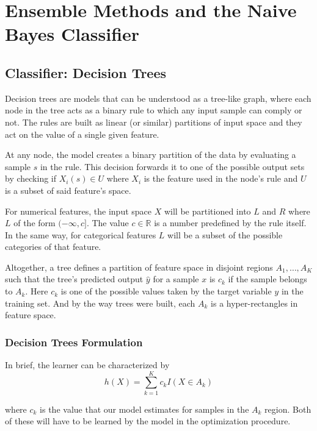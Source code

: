 \chapter{Ensemble Methods and the Naive Bayes Classifier}\label{ch:ensembleMethods}


\section{Classifier: Decision Trees}\label{section:decision_trees}


Decision trees are models that can be understood as a tree-like graph, where each node in the tree acts as a binary rule to which any input sample can comply or not. The rules are built as linear (or similar) partitions of input space and they act on the value of a single given feature.

At any node, the model creates a binary partition of the data by evaluating a sample $s$ in the rule. This decision forwards it to one of the possible output sets by checking if $X_i(s) \in U$ where $X_i$ is the feature used in the node's rule and $U$ is a subset of said feature's space.

For numerical features, the input space $X$ will be partitioned into $L$ and $R$ where $L$ of the form $(-\infty,c]$. The value $c \in \mathbb{R}$ is a number predefined by the rule itself. In the same way, for categorical features $L$ will be a subset of the possible categories of that feature.

Altogether, a tree defines a partition of feature space in disjoint regions $A_1,\ldots,A_K$ such that the tree's predicted output $\hat{y}$ for a sample $x$ is $c_k$ if the sample belongs to $A_k$. Here $c_k$ is one of the possible values taken by the target variable $y$ in the training set. And by the way trees were built, each $A_k$ is a hyper-rectangles in feature space.

\subsection{Decision Trees Formulation}\label{subsection:decision_trees_formulation}
In brief, the learner can be characterized by
\begin{equation}
h(X) = \sum_{k=1}^K c_k I(X \in A_k)
\end{equation}\label{eq:decisionTreeModel}

where $c_k$ is the value that our model estimates for samples in the $A_k$ region. Both of these will have to be learned by the model in the optimization procedure. %

